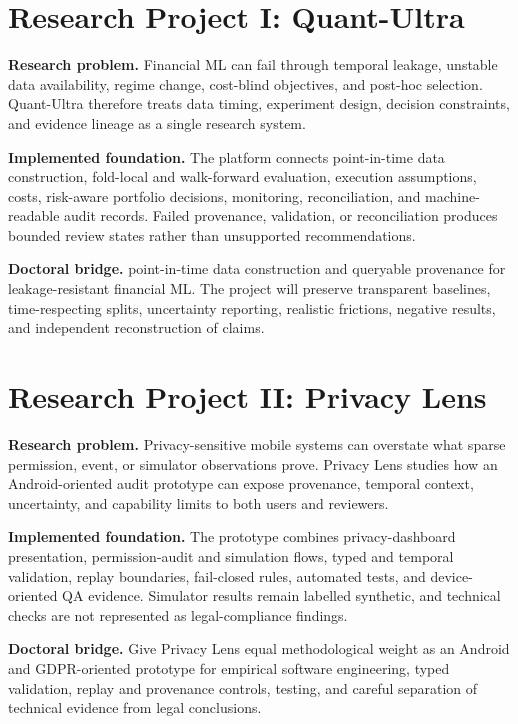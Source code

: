\documentclass[11pt]{article}
\begin{document}
\section*{Research Project I: Quant-Ultra}
\textbf{Research problem.} Financial ML can fail through temporal leakage, unstable data availability, regime change, cost-blind objectives, and post-hoc selection. Quant-Ultra therefore treats data timing, experiment design, decision constraints, and evidence lineage as a single research system.

\textbf{Implemented foundation.} The platform connects point-in-time data construction, fold-local and walk-forward evaluation, execution assumptions, costs, risk-aware portfolio decisions, monitoring, reconciliation, and machine-readable audit records. Failed provenance, validation, or reconciliation produces bounded review states rather than unsupported recommendations.

\textbf{Doctoral bridge.} point-in-time data construction and queryable provenance for leakage-resistant financial ML. The project will preserve transparent baselines, time-respecting splits, uncertainty reporting, realistic frictions, negative results, and independent reconstruction of claims.

\section*{Research Project II: Privacy Lens}
\textbf{Research problem.} Privacy-sensitive mobile systems can overstate what sparse permission, event, or simulator observations prove. Privacy Lens studies how an Android-oriented audit prototype can expose provenance, temporal context, uncertainty, and capability limits to both users and reviewers.

\textbf{Implemented foundation.} The prototype combines privacy-dashboard presentation, permission-audit and simulation flows, typed and temporal validation, replay boundaries, fail-closed rules, automated tests, and device-oriented QA evidence. Simulator results remain labelled synthetic, and technical checks are not represented as legal-compliance findings.

\textbf{Doctoral bridge.} Give Privacy Lens equal methodological weight as an Android and GDPR-oriented prototype for empirical software engineering, typed validation, replay and provenance controls, testing, and careful separation of technical evidence from legal conclusions.
\end{document}
